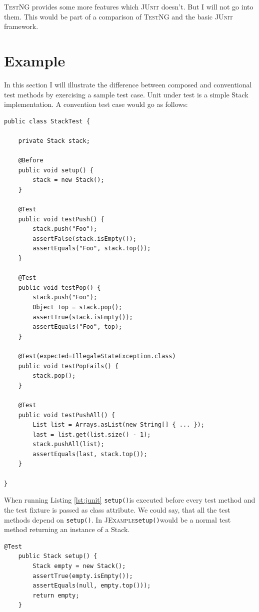 \documentclass[11pt]{article}
\newcommand{\JUnit}{\textsc{JUnit}\xspace}
\newcommand{\JExample}{\textsc{JExample}\xspace}
\newcommand{\TestNG}{\textsc{TestNG}\xspace}
\newcommand{\ttt}[1]{\texttt{#1}}
\newcommand{\setup}{\ttt{setup()}}
\begin{document}
\TestNG provides some more features which \JUnit doesn't. But I will not go into them. This would be part of a comparison of \TestNG and the basic \JUnit framework.

\section{Example}

\lstset{language=Java}

In this section I will illustrate the difference between composed and conventional test methods by exercising a sample test case. Unit under test is a simple Stack implementation. A convention test case would go as follows:

\begin{lstlisting}[label=lst:junit,caption=Conventional \JUnit test case.]
public class StackTest {

    private Stack stack;

    @Before
    public void setup() {
        stack = new Stack();
    }

    @Test
    public void testPush() {
        stack.push("Foo");
        assertFalse(stack.isEmpty());
        assertEquals("Foo", stack.top());
    }

    @Test
    public void testPop() {
        stack.push("Foo");
        Object top = stack.pop();
        assertTrue(stack.isEmpty());
        assertEquals("Foo", top);
    }

    @Test(expected=IllegaleStateException.class)
    public void testPopFails() {
        stack.pop();
    }

    @Test
    public void testPushAll() {
        List list = Arrays.asList(new String[] { ... });
        last = list.get(list.size() - 1);
        stack.pushAll(list);
        assertEquals(last, stack.top());
    }

}
\end{lstlisting}

When running Listing \ref{lst:junit} \setup is executed before every test method and the test fixture is passed as class attribute. We could say, that all the test methods depend on \setup. In \JExample \setup would be a normal test method returning an instance of a Stack.

\begin{lstlisting}[label=lst:setup,caption=Promote fixture to test with return value.]
    @Test
    public Stack setup() {
        Stack empty = new Stack();
        assertTrue(empty.isEmpty());
        assertEquals(null, empty.top()));
        return empty;
    }
\end{lstlisting}
\end{document}
